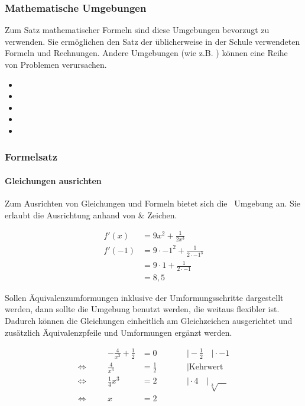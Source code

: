 \subsubsection*{Mathematische Umgebungen}
Zum Satz mathematischer Formeln sind diese Umgebungen bevorzugt zu verwenden. Sie ermöglichen den Satz der üblicherweise in der Schule verwendeten Formeln und Rechnungen. Andere Umgebungen (wie z.B. ) können eine Reihe von Problemen verursachen.
\begin{multicols}{3}
	\begin{itemize}
		\item{}\sarg
		\item{}\sarg
		\item{}\sarg
		\item{}\sarg
		\item{}\sarg
	\end{itemize}
\end{multicols}

\subsubsection*{Formelsatz}

\paragraph{Gleichungen ausrichten}

Zum Ausrichten von Gleichungen und Formeln bietet sich die \sarg\ Umgebung an. Sie erlaubt die Ausrichtung anhand von \& Zeichen.
\begin{example}
	\begin{align*}
	f'(x) &= 9x^2 + \frac{1}{2x^3} \\
	f'(-1) &= 9\cdot -1^2 + \frac{1}{2\cdot -1^3} \\
		&= 9\cdot 1 + \frac{1}{2\cdot -1} \\
		&= 8,5
	\end{align*}
\end{example}


Sollen Äquivalenzumformungen inklusive der Umformungsschritte dargestellt werden, dann sollte die Umgebung \sarg benutzt werden, die weitaus flexibler ist. Dadurch können die Gleichungen einheitlich am Gleichzeichen ausgerichtet und zusätzlich Äquivalenzpfeile und Umformungen ergänzt werden.
\begin{example}
	\begin{alignat*}{3}
	&& -\frac{4}{x^3} + \frac{1}{2} &= 0 &&\qquad\rvert-\frac{1}{2}\quad\rvert\cdot -1 \\
	\Leftrightarrow\quad && \frac{4}{x^3} &= \frac{1}{2} &&\qquad\rvert\text{Kehrwert}\\
	\Leftrightarrow\quad && \frac{1}{4}x^3 &= 2 &&\qquad\rvert\cdot 4\quad|\sqrt[3]{\quad}\\
	\Leftrightarrow\quad && x &= 2 &&
	\end{alignat*}
\end{example}

